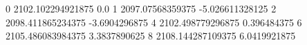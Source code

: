 0 2102.102294921875 0.0
1 2097.07568359375 -5.026611328125
2 2098.411865234375 -3.6904296875
4 2102.498779296875 0.396484375
6 2105.486083984375 3.3837890625
8 2108.144287109375 6.0419921875

